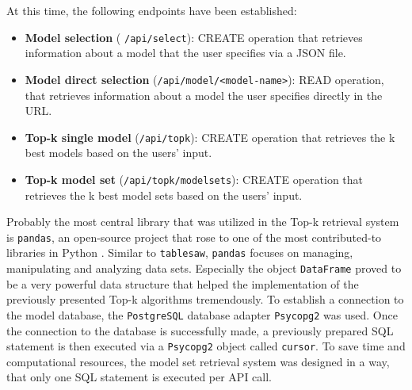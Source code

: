 At this time, the following endpoints have been established:


\begin{itemize}

\item \textbf{Model selection} ( \texttt{/api/select}): CREATE operation that retrieves information about a model that the user specifies via a JSON file. 
\item \textbf{Model direct selection} (\texttt{/api/model/<model-name>}): READ operation, that retrieves information about a model the user specifies directly in the URL.
\item \textbf{Top-k single model} (\texttt{/api/topk}): CREATE operation that retrieves the k best models based on the users' input.
\item \textbf{Top-k model set} (\texttt{/api/topk/modelsets}): CREATE operation that retrieves the k best model sets based on the users' input.
\end{itemize}


Probably the most central library that was utilized in the Top-k retrieval system is \texttt{pandas}, an open-source project that rose to one of the most contributed-to libraries in Python \cite{mckinney2022}. Similar to \texttt{tablesaw}, \texttt{pandas} focuses on managing, manipulating and analyzing data sets. Especially the object \texttt{DataFrame} proved to be a very powerful data structure that helped the implementation of the previously presented Top-k algorithms tremendously. To establish a connection to the model database, the \texttt{PostgreSQL} database adapter \texttt{Psycopg2} was used. Once the connection to the database is successfully made, a previously prepared SQL statement is then executed via a \texttt{Psycopg2} object called \texttt{cursor}. To save time and computational resources, the model set retrieval system was designed in a way, that only one SQL statement is executed per API call. 

